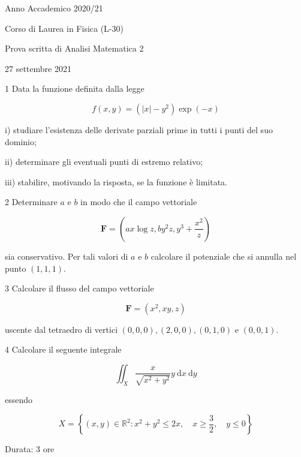 \documentclass[10pt]{article}
\begin{document}
Anno Accademico 2020/21

Corso di Laurea in Fisica (L-30)

Prova scritta di Analisi Matematica 2

27 settembre 2021

1 Data la funzione definita dalla legge

\[
f(x, y)=\left(|x|-y^{2}\right) \exp (-x)
\]

i) studiare l'esistenza delle derivate parziali prime in tutti i punti del suo dominio;

ii) determinare gli eventuali punti di estremo relativo;

iii) stabilire, motivando la risposta, se la funzione è limitata.

2 Determinare \(a\) e \(b\) in modo che il campo vettoriale

\[
\mathbf{F}=\left(a x \log z, b y^{2} z, y^{3}+\frac{x^{2}}{z}\right)
\]

sia conservativo. Per tali valori di \(a\) e \(b\) calcolare il potenziale che si annulla nel punto \((1,1,1)\).

3 Calcolare il flusso del campo vettoriale

\[
\mathbf{F}=\left(x^{2}, x y, z\right)
\]

uscente dal tetraedro di vertici \((0,0,0),(2,0,0),(0,1,0)\) e \((0,0,1)\).

4 Calcolare il seguente integrale

\[
\iint_{X} \frac{x}{\sqrt{x^{2}+y^{2}}} y \mathrm{~d} x \mathrm{~d} y
\]

essendo

\[
X=\left\{(x, y) \in \mathbb{R}^{2}: x^{2}+y^{2} \leq 2 x, \quad x \geq \frac{3}{2}, \quad y \leq 0\right\}
\]

Durata: 3 ore
\end{document}

